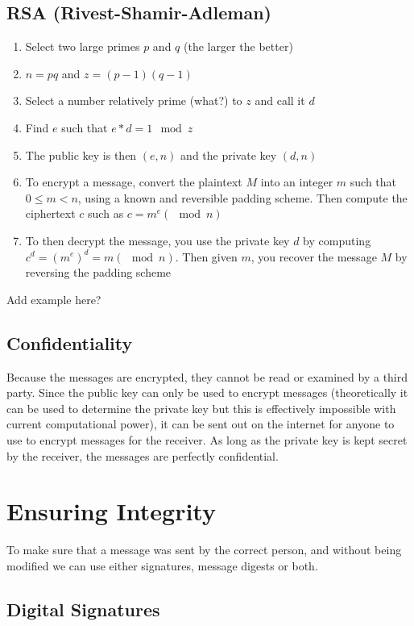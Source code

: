 \subsection*{RSA (Rivest-Shamir-Adleman)}

\begin{enumerate}
  \item Select two large primes $p$ and $q$ (the larger the better)
  \item $n = pq$ and $z = (p - 1)(q - 1)$
  \item Select a number relatively prime (what?) to $z$ and call it $d$
  \item Find $e$ such that $e * d = 1 \mod z$
  \item The public key is then $(e, n)$ and the private key $(d, n)$
  \item To encrypt a message, convert the plaintext $M$ into an integer $m$ such that $0 \leq m < n$, using a known
   and reversible padding scheme. Then compute the ciphertext $c$ such as $c = m^e (\mod n)$
  \item To then decrypt the message, you use the private key $d$ by computing $c^d = {(m^e)}^d = m (\mod n)$. Then given
   $m$, you recover the message $M$ by reversing the padding scheme
\end{enumerate}

{\Huge Add example here?}

\subsection*{Confidentiality}

Because the messages are encrypted, they cannot be read or examined by a third party. Since the public key can only be
 used to encrypt messages (theoretically it can be used to determine the private key but this is effectively impossible
 with current computational power), it can be sent out on the internet for anyone to use to encrypt messages for the
 receiver. As long as the private key is kept secret by the receiver, the messages are perfectly confidential.

\section*{Ensuring Integrity}

To make sure that a message was sent by the correct person, and without being modified we can use either signatures,
 message digests or both.

\subsection*{Digital Signatures}

